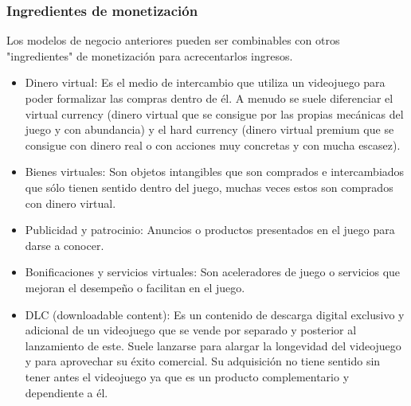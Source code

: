 \begin{table}[htbp]
\begin{tabular}{llll}
	\end{tabular}
\end{table}

\subsubsection{Ingredientes de monetización}
Los modelos de negocio anteriores pueden ser combinables con otros "ingredientes" de monetización para acrecentarlos ingresos. 
\begin{itemize}
	\item Dinero virtual: Es el medio de intercambio que utiliza un videojuego para poder formalizar las compras dentro de él. A menudo se suele diferenciar el virtual currency (dinero virtual que se consigue por las propias mecánicas del juego y con abundancia) y el hard currency (dinero virtual premium que se consigue con dinero real o con acciones muy concretas y con mucha escasez).
	\item Bienes virtuales: Son objetos intangibles que son comprados e intercambiados que sólo tienen sentido dentro del juego, muchas veces estos son comprados con dinero virtual. 
	\item Publicidad y patrocinio: Anuncios o productos presentados en el juego para darse a conocer.
	\item Bonificaciones y servicios virtuales: Son aceleradores de juego o servicios que mejoran el desempeño o facilitan en el juego.
	\item DLC (downloadable content): Es un contenido de descarga digital exclusivo y adicional de un videojuego que se vende por separado y posterior al lanzamiento de este. Suele lanzarse para alargar la longevidad del videojuego y para aprovechar su éxito comercial. Su adquisición no tiene sentido sin tener antes el videojuego ya que es un producto complementario y dependiente a él.
\end{itemize}
